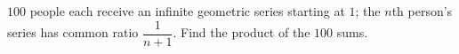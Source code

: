 $100$ people each receive an infinite geometric series starting at $1$; the $n$th person's series has common ratio $\dfrac1{n+1}$. Find the product of the $100$ sums.
